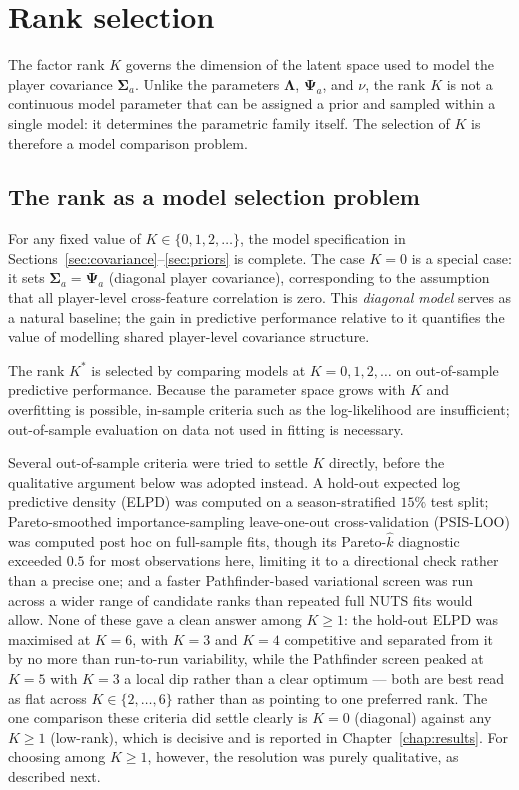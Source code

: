 \section{Rank selection}
\label{sec:rank}

The factor rank $K$ governs the dimension of the latent space used to model the player covariance $\boldsymbol{\Sigma}_a$. Unlike the parameters $\boldsymbol{\Lambda}$, $\boldsymbol{\Psi}_a$, and $\nu$, the rank $K$ is not a continuous model parameter that can be assigned a prior and sampled within a single model: it determines the parametric family itself. The selection of $K$ is therefore a model comparison problem.

\subsection{The rank as a model selection problem}

For any fixed value of $K \in \{0, 1, 2, \ldots\}$, the model specification in Sections~\ref{sec:covariance}--\ref{sec:priors} is complete. The case $K = 0$ is a special case: it sets $\boldsymbol{\Sigma}_a = \boldsymbol{\Psi}_a$ (diagonal player covariance), corresponding to the assumption that all player-level cross-feature correlation is zero. This \emph{diagonal model} serves as a natural baseline; the gain in predictive performance relative to it quantifies the value of modelling shared player-level covariance structure.

The rank $K^*$ is selected by comparing models at $K = 0, 1, 2, \ldots$ on out-of-sample predictive performance. Because the parameter space grows with $K$ and overfitting is possible, in-sample criteria such as the log-likelihood are insufficient; out-of-sample evaluation on data not used in fitting is necessary.

Several out-of-sample criteria were tried to settle $K$ directly, before the qualitative argument below was adopted instead. A hold-out expected log predictive density (ELPD) was computed on a season-stratified $15\%$ test split; Pareto-smoothed importance-sampling leave-one-out cross-validation (PSIS-LOO) \cite{vehtari2017practical} was computed post hoc on full-sample fits, though its Pareto-$\hat{k}$ diagnostic exceeded $0.5$ for most observations here, limiting it to a directional check rather than a precise one; and a faster Pathfinder-based variational screen \cite{zhang2022pathfinder} was run across a wider range of candidate ranks than repeated full NUTS fits would allow. None of these gave a clean answer among $K \geq 1$: the hold-out ELPD was maximised at $K=6$, with $K=3$ and $K=4$ competitive and separated from it by no more than run-to-run variability, while the Pathfinder screen peaked at $K=5$ with $K=3$ a local dip rather than a clear optimum --- both are best read as flat across $K \in \{2,\ldots,6\}$ rather than as pointing to one preferred rank. The one comparison these criteria did settle clearly is $K=0$ (diagonal) against any $K \geq 1$ (low-rank), which is decisive and is reported in Chapter~\ref{chap:results}. For choosing among $K \geq 1$, however, the resolution was purely qualitative, as described next.

